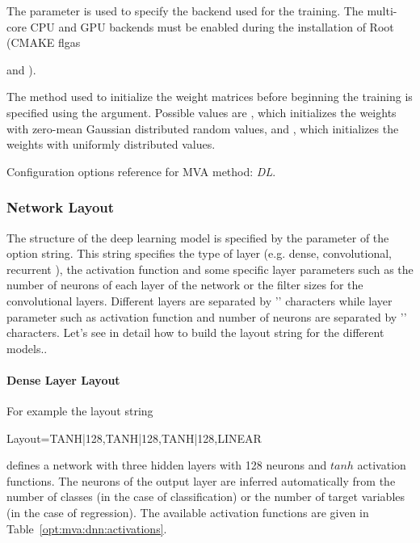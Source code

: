 The  parameter is used to specify the backend used for the
training. The multi-core CPU and GPU backends must be enabled during the installation of Root
(CMAKE flgas { and ). 

The method used to initialize the weight matrices before beginning the
training is specified using the 
argument. Possible values are , which initializes the
weights with zero-mean Gaussian distributed random values, and
, which initializes the weights with uniformly
distributed values.



\begin{option}[h]

\caption[.]{\optionCaptionSize
     Configuration options reference for MVA method: {\em DL}.
}
\label{opt:mva:dnn:options}
\end{option}

\subsubsection{Network Layout}
\label{sec:dnn:layout}

The structure of the deep learning model is specified by the
 parameter of the option string. This string specifies
the type of layer (e.g. dense, convolutional, recurrent ),
the activation function and some specific layer parameters such as the number of neurons of each layer of the
network or the filter sizes for the convolutional layers.  Different layers are separated by '\code{,}' characters while
layer parameter such as activation function and number of neurons are separated by '\code{|}'
characters.
Let's see in detail how to build the layout string for the different models..

\paragraph{Dense Layer Layout}

For example the layout string

\begin{tmvacode}
  Layout=TANH|128,TANH|128,TANH|128,LINEAR
\end{tmvacode}

defines a network with three hidden layers with 128 neurons and
$tanh$ activation functions. The neurons of the output layer are
inferred automatically from the number of classes (in the case of
classification) or the number of target variables (in the case of
regression).  
The available activation functions are given in
Table~\ref{opt:mva:dnn:activations}.

}
